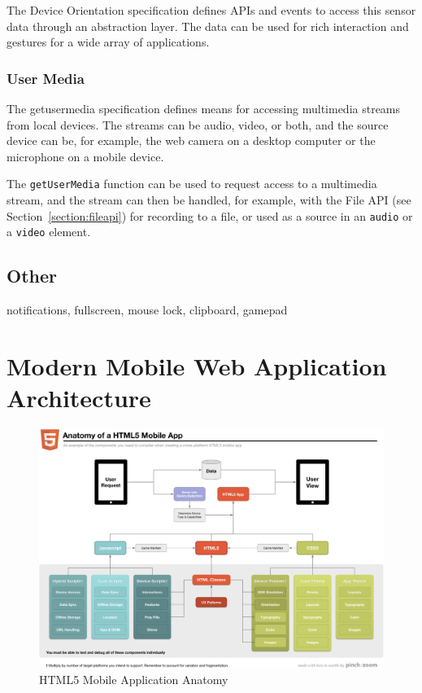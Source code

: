 The Device Orientation specification \cite{DeviceOrientation} defines
APIs and events to access this sensor data through an abstraction
layer. The data can be used for rich interaction and gestures for a
wide array of applications.

\subsubsection{User Media}
\label{section:getusermedia}

The getusermedia specification \cite{getusermedia} defines means for
accessing multimedia streams from local devices. The streams can be
audio, video, or both, and the source device can be, for example, the
web camera on a desktop computer or the microphone on a mobile device.

The \texttt{getUserMedia} function can be used to request access to a
multimedia stream, and the stream can then be handled, for example,
with the File API (see Section~\ref{section:fileapi}) for recording to
a file, or used as a source in an \texttt{audio} or a \texttt{video}
element.

\subsection{Other}

notifications, fullscreen, mouse lock, clipboard, gamepad

\section{Modern Mobile Web Application Architecture}
\label{section:modern-mobile-web}

\begin{figure}[ht]
  \includegraphics[width=\textwidth]{images/anatomy-of-a-html5-mobile-app.png}
  \caption{HTML5 Mobile Application Anatomy \citationneeded}
  \label{figure:anatomy-of-a-html5-mobile-app.png}
\end{figure}

